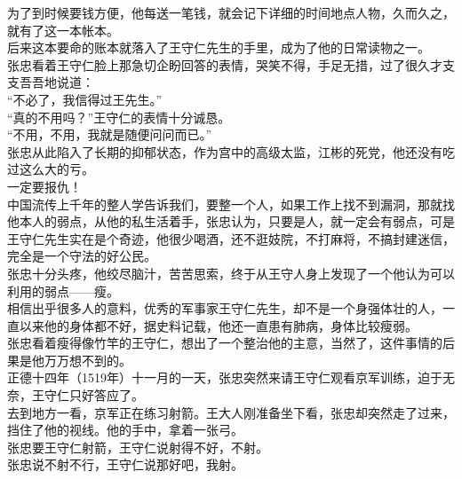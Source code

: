 \begin{multicols}{\theparacolNo}
为了到时候要钱方便，他每送一笔钱，就会记下详细的时间地点人物，久而久之，就有了这一本帐本。\\

后来这本要命的账本就落入了王守仁先生的手里，成为了他的日常读物之一。\\

张忠看着王守仁脸上那急切企盼回答的表情，哭笑不得，手足无措，过了很久才支支吾吾地说道：\\

“不必了，我信得过王先生。”\\

“真的不用吗？”王守仁的表情十分诚恳。\\

“不用，不用，我就是随便问问而已。”\\

张忠从此陷入了长期的抑郁状态，作为宫中的高级太监，江彬的死党，他还没有吃过这么大的亏。\\

一定要报仇！\\

中国流传上千年的整人学告诉我们，要整一个人，如果工作上找不到漏洞，那就找他本人的弱点，从他的私生活着手，张忠认为，只要是人，就一定会有弱点，可是王守仁先生实在是个奇迹，他很少喝酒，还不逛妓院，不打麻将，不搞封建迷信，完全是一个守法的好公民。\\

张忠十分头疼，他绞尽脑汁，苦苦思索，终于从王守人身上发现了一个他认为可以利用的弱点——瘦。\\

相信出乎很多人的意料，优秀的军事家王守仁先生，却不是一个身强体壮的人，一直以来他的身体都不好，据史料记载，他还一直患有肺病，身体比较瘦弱。\\

张忠看着瘦得像竹竿的王守仁，想出了一个整治他的主意，当然了，这件事情的后果是他万万想不到的。\\

正德十四年（1519年）十一月的一天，张忠突然来请王守仁观看京军训练，迫于无奈，王守仁只好答应了。\\

去到地方一看，京军正在练习射箭。王大人刚准备坐下看，张忠却突然走了过来，挡住了他的视线。他的手中，拿着一张弓。\\

张忠要王守仁射箭，王守仁说射得不好，不射。\\

张忠说不射不行，王守仁说那好吧，我射。\\


\end{multicols}
